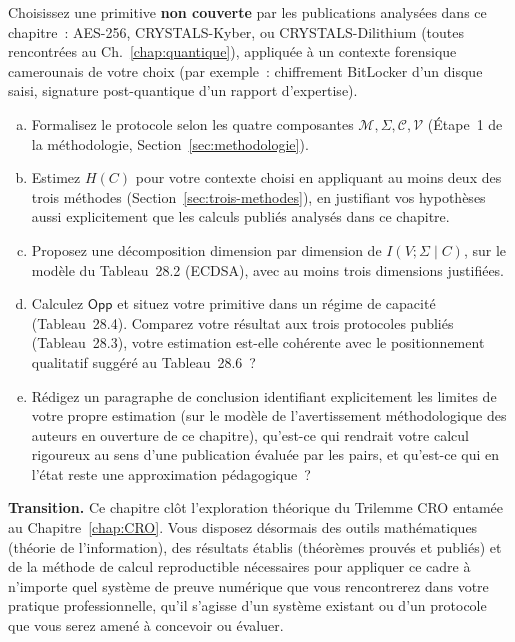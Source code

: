 \begin{boxexo}[title={\ding{45}\quad Exercice~28.3. Esquisser un calcul original \niveauexpert}]
Choisissez une primitive \textbf{non couverte} par les publications
analysées dans ce chapitre~: AES-256, CRYSTALS-Kyber, ou
CRYSTALS-Dilithium (toutes rencontrées au Ch.~\ref{chap:quantique}),
appliquée à un contexte forensique camerounais de votre choix
(par exemple~: chiffrement BitLocker d'un disque saisi, signature
post-quantique d'un rapport d'expertise).
\begin{enumerate}[(a)]
    \item Formalisez le protocole selon les quatre composantes
          $\mathcal{M}, \Sigma, \mathcal{C}, \mathcal{V}$
          (Étape~1 de la méthodologie, Section~\ref{sec:methodologie}).
    \item Estimez $H(C)$ pour votre contexte choisi en appliquant
          au moins deux des trois méthodes
          (Section~\ref{sec:trois-methodes}), en justifiant vos
          hypothèses aussi explicitement que les calculs publiés
          analysés dans ce chapitre.
    \item Proposez une décomposition dimension par dimension de
          $I(V;\Sigma\mid C)$, sur le modèle du Tableau~28.2
          (ECDSA), avec au moins trois dimensions justifiées.
    \item Calculez $\mathsf{Opp}$ et situez votre primitive dans
          un régime de capacité (Tableau~28.4). Comparez votre
          résultat aux trois protocoles publiés
          (Tableau~28.3), votre estimation est-elle cohérente
          avec le positionnement qualitatif suggéré au
          Tableau~28.6~?
    \item Rédigez un paragraphe de conclusion identifiant
          explicitement les limites de votre propre estimation
          (sur le modèle de l'avertissement méthodologique des
          auteurs en ouverture de ce chapitre), qu'est-ce qui
          rendrait votre calcul rigoureux au sens d'une publication
          évaluée par les pairs, et qu'est-ce qui en l'état reste
          une approximation pédagogique~?
\end{enumerate}
\end{boxexo}

\bigskip

\begin{boxinfo}
\textbf{Transition.} Ce chapitre clôt l'exploration théorique du
Trilemme CRO entamée au Chapitre~\ref{chap:CRO}. Vous disposez
désormais des outils mathématiques (théorie de l'information), des
résultats établis (théorèmes prouvés et publiés) et de la méthode
de calcul reproductible nécessaires pour appliquer ce cadre à
n'importe quel système de preuve numérique que vous rencontrerez
dans votre pratique professionnelle, qu'il s'agisse d'un système
existant ou d'un protocole que vous serez amené à concevoir ou
évaluer.
\end{boxinfo}

